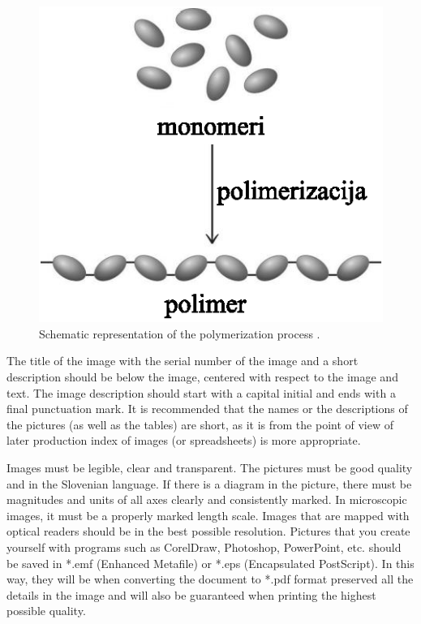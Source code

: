 \begin{figure}[ht!]
\begin{centering}
\includegraphics[scale=1.0]{figures/neke_molekule}
\caption{Schematic representation of the polymerization process
\cite{stropnik_1997,Doe_1991}.} \label{fig:some_molecules}
\end{centering}
\end{figure}

The title of the image with the serial number of the image and a short description should be below the image,
centered with respect to the image and text. The image description should start with a capital
initial and ends with a final punctuation mark. It is recommended that the names or
the descriptions of the pictures (as well as the tables) are short, as it is from the point of view of later production
index of images (or spreadsheets) is more appropriate.

Images must be legible, clear and transparent. The pictures must be good
quality and in the Slovenian language. If there is a diagram in the picture, there must be magnitudes
and units of all axes clearly and consistently marked. In microscopic images, it must
be a properly marked length scale. Images that are mapped with optical
readers should be in the best possible resolution. Pictures that you create yourself with
programs such as CorelDraw, Photoshop, PowerPoint, etc. should be saved in
*.emf (Enhanced Metafile) or *.eps (Encapsulated
PostScript). In this way, they will be when converting the document to *.pdf format
preserved all the details in the image and will also be guaranteed when printing
the highest possible quality.

